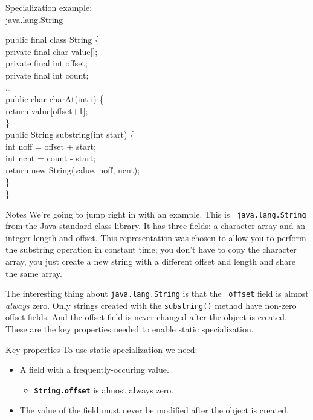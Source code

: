 \documentclass[%
pdf,
colorBG,
slideColor,
nototal,
oqe
]{prosper}
\newenvironment{talknotes}{\begin{slide}{Notes}\tiny}{\end{slide}}
\begin{document}
\begin{slide}{Specialization example:\\\small java.lang.String}
\fontsize{9}{9}%
\bfseries\begin{samplecode}%
public final class String \{\\
\>private final char value[];\\
\>private final int offset;\\
\>private final int count;\\
\>\ldots\\
\>public char charAt(int i) \{\\
\>\>return value[offset+1];\\
\>\}\\
\>public String substring(int start) \{\\
\>\>int noff = offset + start;\\
\>\>int ncnt = count - start;\\
\>\>return new String(value, noff, ncnt);\\
\>\}\\
\}\\
\end{samplecode}
\end{slide}

\begin{talknotes}
We're going to jump right in with an example.  This is {\tt
  java.lang.String} from the Java standard class library.  It has
three fields: a character array and an integer length and offset.
This representation was chosen to allow you to perform the substring
operation in constant time; you don't have to copy the character array, you
just create a new string with a different offset and length and
share the same array.

The interesting thing about {\tt java.lang.String} is that the {\tt
  offset} field is almost \emph{always} zero.  Only strings created
with the {\tt substring()} method have non-zero offset fields. 
And the offset field is never changed after the object is created.
These are the key properties needed to enable static specialization.
\end{talknotes}

\begin{slide}{Key properties}
To use static specialization we need:
\begin{itemize}
 \item A field with a frequently-occuring value.
  \begin{itemize}\small
   \item {\tt\bfseries String.offset} is almost always zero.
  \end{itemize}
 \item The value of the field must never be modified after the object
       is created.
\end{itemize}
\end{slide}
\end{document}
